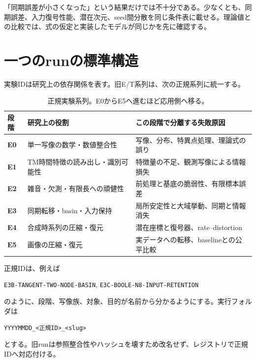 \documentclass[a4paper,11pt,oneside,openany]{ltjsbook}
\newcommand{\code}[1]{\texttt{#1}}
\begin{document}
\begin{reportbox}
「同期誤差が小さくなった」という結果だけでは不十分である。少なくとも、同期誤差、入力復号性能、潜在次元、seed間分散を同じ条件表に載せる。理論値との比較では、式の仮定と実装したモデルが同じかを先に確認する。
\end{reportbox}

\section{一つのrunの標準構造}

実験IDは研究上の依存関係を表す。旧E/T系列は、次の正規系列に統一する。

\begin{table}[htbp]
\centering
\caption{正規実験系列。E0からE5へ進むほど応用側へ移る。}
\label{tab:canonical_stages}
\begin{tabularx}{\textwidth}{>{\bfseries}p{14mm}p{43mm}X}
\toprule
段階 & 研究上の役割 & この段階で分離する失敗原因 \\
\midrule
E0 & 単一写像の数学・数値整合性 & 写像、分布、特異点処理、理論式の誤り \\
E1 & TM時間特徴の読み出し・識別可能性 & 特徴量の不足、観測写像による情報損失 \\
E2 & 雑音・欠測・有限長への頑健性 & 前処理と基底の脆弱性、有限標本誤差 \\
E3 & 同期転移・basin・入力保持 & 局所安定性と大域挙動、同期と情報消失 \\
E4 & 合成時系列の圧縮・復元 & 潜在座標と復号器、rate--distortion \\
E5 & 画像の圧縮・復元 & 実データへの転移、baselineとの公平比較 \\
\bottomrule
\end{tabularx}
\end{table}

正規IDは、例えば
\begin{center}
\code{E3B-TANGENT-TWO-NODE-BASIN},\quad
\code{E3C-BOOLE-N8-INPUT-RETENTION}
\end{center}
のように、段階、写像族、対象、目的が名前から分かるようにする。実行フォルダは
\begin{center}
\code{YYYYMMDD\_<正規ID>\_<slug>}
\end{center}
とする。旧runは参照整合性やハッシュを壊すため改名せず、レジストリで正規IDへ対応付ける。
\end{document}
